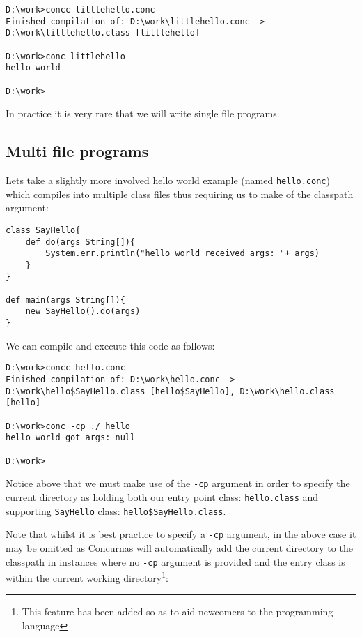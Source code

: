 \documentclass[conc-doc]{subfiles}
\begin{document}
\begin{lstlisting}[language=None]
D:\work>concc littlehello.conc
Finished compilation of: D:\work\littlehello.conc -> D:\work\littlehello.class [littlehello]

D:\work>conc littlehello
hello world

D:\work>
\end{lstlisting}

In practice it is very rare that we will write single file programs.

\subsection{Multi file programs}
Lets take a slightly more involved hello world example (named \lstinline[language=None]{hello.conc}) which compiles into multiple class files thus requiring us to make of the classpath argument:

\begin{lstlisting}
class SayHello{
	def do(args String[]){
		System.err.println("hello world received args: "+ args)
	}
}

def main(args String[]){
	new SayHello().do(args)
}
\end{lstlisting}

We can compile and execute this code as follows:

\begin{lstlisting}[language=None]
D:\work>concc hello.conc
Finished compilation of: D:\work\hello.conc -> D:\work\hello$SayHello.class [hello$SayHello], D:\work\hello.class [hello]

D:\work>conc -cp ./ hello
hello world got args: null

D:\work>
\end{lstlisting}

Notice above that we must make use of the \lstinline[language=None]{-cp} argument in order to specify the current directory as holding both our entry point class: \lstinline{hello.class} and supporting \lstinline{SayHello} class: \lstinline{hello$SayHello.class}.

Note that whilst it is best practice to specify a \lstinline[language=None]{-cp} argument, in the above case it may be omitted as Concurnas will automatically add the current directory to the classpath in instances where no \lstinline[language=None]{-cp} argument is provided and the entry class is within the current working directory\footnote{This feature has been added so as to aid newcomers to the programming language}:
\end{document}
